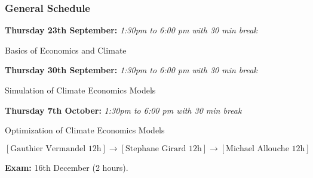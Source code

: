 \documentclass[xcolor=x11names,compress,aspectratio=169]{beamer}%
\makeatletter
\renewenvironment{itemize}{\begin{compactitemize}[<+-| alert@+>]}{\end{compactitemize}}
\makeatother
\begin{document}
\begin{frame}%
%

\frametitle{General Schedule}%


\begin{itemize}
\item \textbf{Thursday 23th September:} \textit{1:30pm to 6:00 pm with 30 min
break}

\textsf{Basics of Economics and Climate}%
\vspace{1ex}%


\item \textbf{Thursday 30th September:}\textit{ 1:30pm to 6:00 pm with 30 min
break}

\textsf{Simulation of \textsf{Climate Economics} Models}%
\vspace{1ex}%


\item \textbf{Thursday 7th October:}\textit{ 1:30pm to 6:00 pm with 30 min
break}

\textsf{Optimization of Climate Economics Models}
\end{itemize}

%

\[
\left[  \text{Gauthier Vermandel 12h}\right]  \rightarrow\left[
\text{Stephane Girard 12h}\right]  \rightarrow\left[  \text{Michael Allouche
12h}\right]
\]


\textbf{Exam:} 16th December (2 hours).%

\transboxout
\end{frame}%
%

\fi
%
\end{document}
